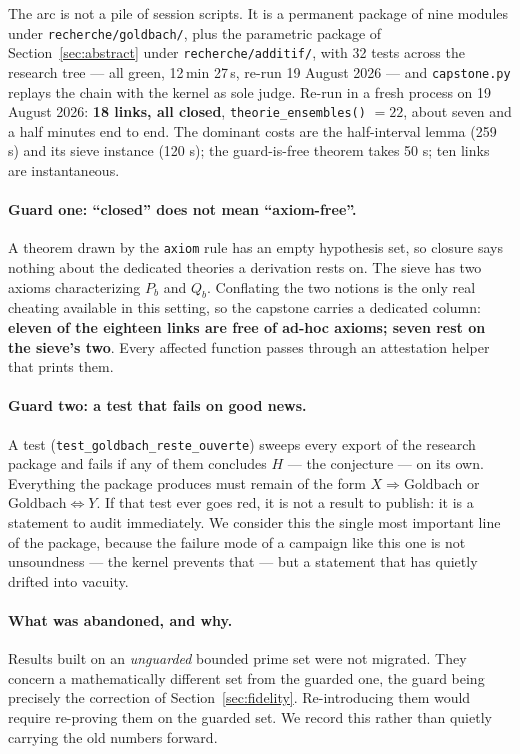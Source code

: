 \documentclass[11pt]{article}
\theoremstyle{remark}\newtheorem{remark}{Remark}
\begin{document}
The arc is not a pile of session scripts. It is a permanent package of nine modules
under \texttt{recherche/goldbach/}, plus the parametric package of
Section~\ref{sec:abstract} under \texttt{recherche/additif/}, with 32 tests across the
research tree --- all green, 12\,min 27\,s, re-run 19 August 2026 --- and
\texttt{capstone.py} replays the chain with the kernel as sole judge. Re-run in a fresh process on 19 August 2026: \textbf{18 links, all closed},
\texttt{theorie\_ensembles()} $= 22$, about seven and a half minutes end to end. The
dominant costs are the half-interval lemma (259 s) and its sieve instance (120 s); the
guard-is-free theorem takes 50 s; ten links are instantaneous.

\paragraph{Guard one: ``closed'' does not mean ``axiom-free''.} A theorem drawn by the
\texttt{axiom} rule has an empty hypothesis set, so closure says nothing about the
dedicated theories a derivation rests on. The sieve has two axioms characterizing
$P_b$ and $Q_b$. Conflating the two notions is the only real cheating available in this
setting, so the capstone carries a dedicated column: \textbf{eleven of the eighteen
links are free of ad-hoc axioms; seven rest on the sieve's two}. Every affected function
passes through an attestation helper that prints them.

\paragraph{Guard two: a test that fails on good news.} A test
(\texttt{test\_goldbach\_reste\_ouverte}) sweeps every export of the research package
and fails if any of them concludes $H$ --- the conjecture --- on its own. Everything the package produces must remain of the form $X \Rightarrow
\mathrm{Goldbach}$ or $\mathrm{Goldbach} \Leftrightarrow Y$. If that test ever goes red,
it is not a result to publish: it is a statement to audit immediately. We consider this
the single most important line of the package, because the failure mode of a campaign
like this one is not unsoundness --- the kernel prevents that --- but a statement that has
quietly drifted into vacuity.

\paragraph{What was abandoned, and why.} Results built on an \emph{unguarded} bounded
prime set were not migrated. They concern a mathematically different set from the
guarded one, the guard being precisely the correction of Section~\ref{sec:fidelity}.
Re-introducing them would require re-proving them on the guarded set. We record this
rather than quietly carrying the old numbers forward.
\end{document}
